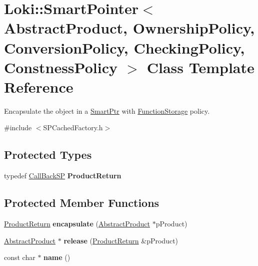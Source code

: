 \hypertarget{classLoki_1_1SmartPointer}{}\section{Loki\+:\+:Smart\+Pointer$<$ Abstract\+Product, Ownership\+Policy, Conversion\+Policy, Checking\+Policy, Constness\+Policy $>$ Class Template Reference}
\label{classLoki_1_1SmartPointer}


Encapsulate the object in a \hyperlink{classLoki_1_1SmartPtr}{Smart\+Ptr} with \hyperlink{classLoki_1_1FunctionStorage}{Function\+Storage} policy.  




{\ttfamily \#include $<$S\+P\+Cached\+Factory.\+h$>$}

\subsection*{Protected Types}
\begin{DoxyCompactItemize}
\item 
\hypertarget{classLoki_1_1SmartPointer_a18a85c73f170826685f4ba7bc38e25d9}{}typedef \hyperlink{classLoki_1_1SmartPtr}{Call\+Back\+S\+P} {\bfseries Product\+Return}\label{classLoki_1_1SmartPointer_a18a85c73f170826685f4ba7bc38e25d9}

\end{DoxyCompactItemize}
\subsection*{Protected Member Functions}
\begin{DoxyCompactItemize}
\item 
\hypertarget{classLoki_1_1SmartPointer_a6c631494abadc625528348f7b156132e}{}\hyperlink{classLoki_1_1SmartPtr}{Product\+Return} {\bfseries encapsulate} (\hyperlink{classAbstractProduct}{Abstract\+Product} $\ast$p\+Product)\label{classLoki_1_1SmartPointer_a6c631494abadc625528348f7b156132e}

\item 
\hypertarget{classLoki_1_1SmartPointer_a372df07ccaa8887b975b606282441212}{}\hyperlink{classAbstractProduct}{Abstract\+Product} $\ast$ {\bfseries release} (\hyperlink{classLoki_1_1SmartPtr}{Product\+Return} \&p\+Product)\label{classLoki_1_1SmartPointer_a372df07ccaa8887b975b606282441212}

\item 
\hypertarget{classLoki_1_1SmartPointer_abdb35ff2b4eed62c1c03bf149eae3eb9}{}const char $\ast$ {\bfseries name} ()\label{classLoki_1_1SmartPointer_abdb35ff2b4eed62c1c03bf149eae3eb9}

\end{DoxyCompactItemize}


